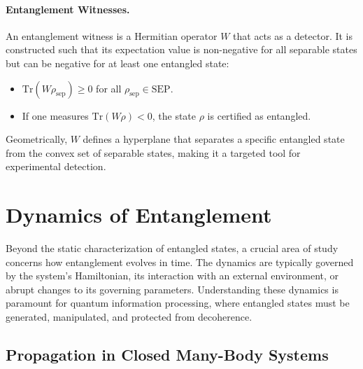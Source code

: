 \paragraph{Entanglement Witnesses.}
An entanglement witness is a Hermitian operator $W$ that acts as a
detector. It is constructed such that its expectation value is non-negative
for all separable states but can be negative for at least one entangled state:
\begin{itemize}
	\item $\mathrm{Tr}(W \rho_{\text{sep}}) \ge 0$ for all $\rho_{\text{sep}} \in \text{SEP}$.
	\item If one measures $\mathrm{Tr}(W \rho) < 0$, the state $\rho$ is certified as entangled.
\end{itemize}
Geometrically, $W$ defines a hyperplane that separates a specific entangled
state from the convex set of separable states, making it a targeted tool for
experimental detection.

\section{Dynamics of Entanglement}
\label{sec:entanglement_dynamics}

Beyond the static characterization of entangled states, a crucial area of
study concerns how entanglement evolves in time. The dynamics are typically
governed by the system's Hamiltonian, its interaction with an external
environment, or abrupt changes to its governing parameters. Understanding
these dynamics is paramount for quantum information processing, where entangled
states must be generated, manipulated, and protected from decoherence.

\subsection{Propagation in Closed Many-Body Systems}
\label{sub:propagation}

